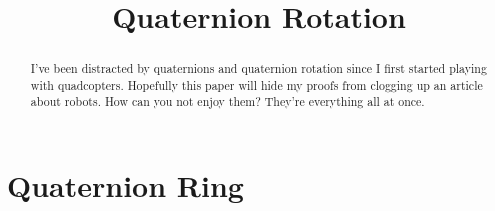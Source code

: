 \documentclass{amsart}
\theoremstyle{definition}
\theoremstyle{remark}
\numberwithin{equation}{section}
\begin{document}
\title{Quaternion Rotation}

\begin{abstract}
I've been distracted by quaternions and quaternion rotation since I first started playing with quadcopters. Hopefully this paper will hide my proofs from clogging up an article about robots. How can you not enjoy them? They're everything all at once.
\end{abstract}

\maketitle


\section{Quaternion Ring}
\end{document}
